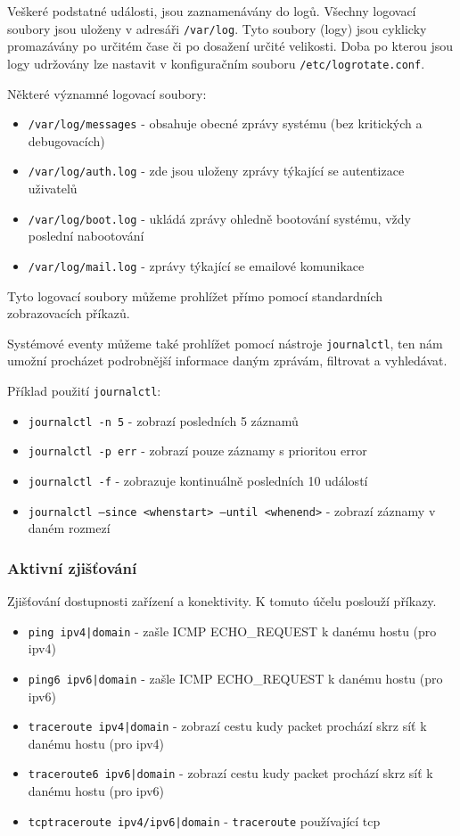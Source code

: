Veškeré podstatné události, jsou zaznamenávány do logů. Všechny logovací soubory jsou uloženy v adresáři \texttt{/var/log}. Tyto soubory (logy) jsou cyklicky promazávány po určitém čase či po dosažení určité velikosti. Doba po kterou jsou logy udržovány lze nastavit v konfiguračním souboru \texttt{/etc/logrotate.conf}.

Některé významné logovací soubory:
\begin{itemize}
				\item \texttt{/var/log/messages} - obsahuje obecné zprávy systému (bez kritických a debugovacích)
				\item \texttt{/var/log/auth.log} - zde jsou uloženy zprávy týkající se autentizace uživatelů
				\item \texttt{/var/log/boot.log} - ukládá zprávy ohledně bootování systému, vždy poslední nabootování
				\item \texttt{/var/log/mail.log} - zprávy týkající se emailové komunikace
\end{itemize}

Tyto logovací soubory můžeme prohlížet přímo pomocí standardních zobrazovacích příkazů.

Systémové eventy můžeme také prohlížet pomocí nástroje \texttt{journalctl}, ten nám umožní procházet podrobnější informace daným zprávám, filtrovat a vyhledávat.

Příklad použití \texttt{journalctl}:
\begin{itemize}
				\item \texttt{journalctl -n 5} - zobrazí posledních 5 záznamů
				\item \texttt{journalctl -p err} - zobrazí pouze záznamy s prioritou error
				\item \texttt{journalctl -f} - zobrazuje kontinuálně posledních 10 událostí
				\item \texttt{journalctl --since <whenstart> --until <whenend>} - zobrazí záznamy v daném rozmezí
\end{itemize}


\subsubsection{Aktivní zjišťování}
Zjišťování dostupnosti zařízení a konektivity. K tomuto účelu poslouží příkazy.

\begin{itemize}
				\item \texttt{ping ipv4|domain} - zašle ICMP ECHO\_REQUEST k danému hostu (pro ipv4)
				\item \texttt{ping6 ipv6|domain} - zašle ICMP ECHO\_REQUEST k danému hostu (pro ipv6)
				\item \texttt{traceroute ipv4|domain} - zobrazí cestu kudy packet prochází skrz síť k danému hostu (pro ipv4)
				\item \texttt{traceroute6 ipv6|domain} - zobrazí cestu kudy packet prochází skrz síť k danému hostu (pro ipv6)
				\item \texttt{tcptraceroute ipv4/ipv6|domain} - \texttt{traceroute} používající tcp
\end{itemize}

